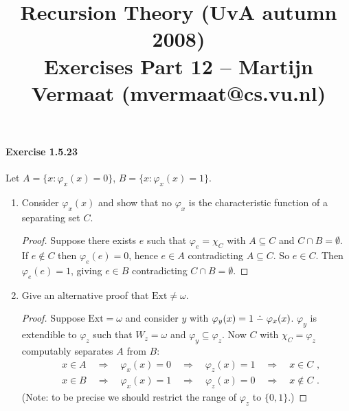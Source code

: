 \documentclass[a4paper,11pt]{article}
\title{Recursion Theory (UvA autumn 2008)\\
\normalsize{Exercises Part 12 -- Martijn Vermaat (mvermaat@cs.vu.nl)}}
\date{}
\newcommand{\dotmin}{\buildrel\textstyle.\over{\hbox{\vrule height3pt depth0pt width0pt}{\smash-}}}
\begin{document}
\maketitle


\paragraph{Exercise 1.5.23}

Let $A = \{x : \varphi_x(x) = 0 \}$, $B = \{x : \varphi_x(x) = 1\}$.

\begin{enumerate}[label=(\alph*)]

\item Consider $\varphi_x(x)$ and show that no $\varphi_x$ is the characteristic function of a separating set $C$.
\begin{proof}
Suppose there exists $e$ such that $\varphi_e = \chi_C$ with $A \subseteq C$ and $C \cap B = \emptyset$.
If $e \notin C$ then $\varphi_e(e) = 0$, hence $e \in A$ contradicting $A \subseteq C$.
So $e \in C$. Then $\varphi_e(e) = 1$, giving $e \in B$ contradicting $C \cap B = \emptyset$.
\end{proof}

\item Give an alternative proof that $\text{Ext} \neq \omega$.
\begin{proof}
Suppose $\text{Ext} = \omega$ and consider $y$ with $\varphi_y(x) = 1 \dotmin \varphi_x(x)$.
$\varphi_y$ is extendible to $\varphi_z$ such that $W_z = \omega$ and $\varphi_y \subseteq \varphi_z$.
Now $C$ with $\chi_C = \varphi_z$ computably separates $A$ from $B$:
\begin{align*}
  & x \in A \quad \Rightarrow \quad \varphi_x(x) = 0 \quad \Rightarrow \quad \varphi_z(x) = 1 \quad \Rightarrow \quad x \in C \text{ ,}\\
  & x \in B \quad \Rightarrow \quad \varphi_x(x) = 1 \quad \Rightarrow \quad \varphi_z(x) = 0 \quad \Rightarrow \quad x \notin C \text{ .}
\end{align*}
(Note: to be precise we should restrict the range of $\varphi_z$ to $\{0, 1\}$.)
\end{proof}


\end{enumerate}
\end{document}
